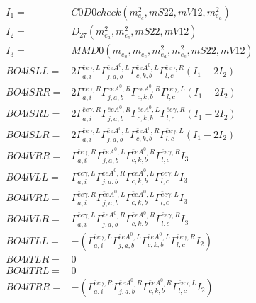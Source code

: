 \documentclass[A4,landscape]{article}
\begin{document}
\begin{align} 
I_1 = & C0D0check(m^2_{e_{{c}}}, mS22, mV12, m^2_{e_{{a}}}) \\ 
I_2 = & D_{27}(m^2_{e_{{a}}}, m^2_{e_{{c}}}, mS22, mV12) \\ 
I_3 = & MMD0(m_{e_{{a}}}, m_{e_{{c}}}, m^2_{e_{{a}}}, m^2_{e_{{c}}}, mS22, mV12) \\ 
  BO4lSLL= & 2  \Gamma^{\bar{e}e \gamma ,L}_{a, i} \Gamma^{\bar{e}e A^0 ,L}_{j, a, b} \Gamma^{\bar{e}e A^0 ,L}_{c, k, b} \Gamma^{\bar{e}e \gamma ,R}_{l, c} (I_1 - 2 I_2) \\ 
  BO4lSRR= & 2  \Gamma^{\bar{e}e \gamma ,R}_{a, i} \Gamma^{\bar{e}e A^0 ,R}_{j, a, b} \Gamma^{\bar{e}e A^0 ,R}_{c, k, b} \Gamma^{\bar{e}e \gamma ,L}_{l, c} (I_1 - 2 I_2) \\ 
  BO4lSRL= & 2  \Gamma^{\bar{e}e \gamma ,R}_{a, i} \Gamma^{\bar{e}e A^0 ,R}_{j, a, b} \Gamma^{\bar{e}e A^0 ,L}_{c, k, b} \Gamma^{\bar{e}e \gamma ,R}_{l, c} (I_1 - 2 I_2) \\ 
  BO4lSLR= & 2  \Gamma^{\bar{e}e \gamma ,L}_{a, i} \Gamma^{\bar{e}e A^0 ,L}_{j, a, b} \Gamma^{\bar{e}e A^0 ,R}_{c, k, b} \Gamma^{\bar{e}e \gamma ,L}_{l, c} (I_1 - 2 I_2) \\ 
  BO4lVRR= &  \Gamma^{\bar{e}e \gamma ,R}_{a, i} \Gamma^{\bar{e}e A^0 ,L}_{j, a, b} \Gamma^{\bar{e}e A^0 ,R}_{c, k, b} \Gamma^{\bar{e}e \gamma ,R}_{l, c} I_3 \\ 
  BO4lVLL= &  \Gamma^{\bar{e}e \gamma ,L}_{a, i} \Gamma^{\bar{e}e A^0 ,R}_{j, a, b} \Gamma^{\bar{e}e A^0 ,L}_{c, k, b} \Gamma^{\bar{e}e \gamma ,L}_{l, c} I_3 \\ 
  BO4lVRL= &  \Gamma^{\bar{e}e \gamma ,R}_{a, i} \Gamma^{\bar{e}e A^0 ,L}_{j, a, b} \Gamma^{\bar{e}e A^0 ,L}_{c, k, b} \Gamma^{\bar{e}e \gamma ,L}_{l, c} I_3 \\ 
  BO4lVLR= &  \Gamma^{\bar{e}e \gamma ,L}_{a, i} \Gamma^{\bar{e}e A^0 ,R}_{j, a, b} \Gamma^{\bar{e}e A^0 ,R}_{c, k, b} \Gamma^{\bar{e}e \gamma ,R}_{l, c} I_3 \\ 
  BO4lTLL= & -( \Gamma^{\bar{e}e \gamma ,L}_{a, i} \Gamma^{\bar{e}e A^0 ,L}_{j, a, b} \Gamma^{\bar{e}e A^0 ,L}_{c, k, b} \Gamma^{\bar{e}e \gamma ,R}_{l, c} I_2) \\ 
  BO4lTLR= & 0 \\ 
  BO4lTRL= & 0 \\ 
  BO4lTRR= & -( \Gamma^{\bar{e}e \gamma ,R}_{a, i} \Gamma^{\bar{e}e A^0 ,R}_{j, a, b} \Gamma^{\bar{e}e A^0 ,R}_{c, k, b} \Gamma^{\bar{e}e \gamma ,L}_{l, c} I_2) \\ 
\end{align} 
\end{document}
